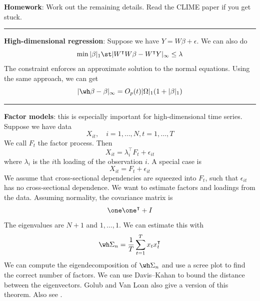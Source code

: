 \textbf{Homework}: Work out the remaining details. Read the CLIME paper \citep{CLM11} if you get stuck.

\begin{center}\rule{0.5\linewidth}{0.5pt}\end{center}

\textbf{High-dimensional regression}: Suppose we have \(Y = W \beta + \epsilon\). We can also do
\[\min |\beta|_1 \st |W^\intercal W \beta - W^\intercal Y|_\infty \leq \lambda\]
The constraint enforces an approximate solution to the normal equations. Using the same approach, we can get
\[|\wh \beta - \beta|_\infty = O_p(t) |\Omega|_1 (1 + |\beta|_1)\]

\begin{center}\rule{0.5\linewidth}{0.5pt}\end{center}

\textbf{Factor models}: this is especially important for high-dimensional time series. Suppose we have data
\[X_{it}, \quad i = 1, \dots, N, t = 1, \dots, T\]
We call \(F_t\) the factor process. Then
\[X_{it} = \lambda_i^\intercal F_t + \epsilon_{it}\]
where \(\lambda_i\) is the \(i\)th loading of the observation \(i\). A special case is
\[X_{it} = F_t + \epsilon_{it}\]
We assume that cross-sectional dependencies are squeezed into \(F_t\), such that \(\epsilon_{it}\) has no cross-sectional dependence. We want to estimate factors and loadings from the data. Assuming normality, the covariance matrix is
\[\one\one^\intercal + I\]
The eigenvalues are \(N + 1\) and \(1, \dots, 1\). We can estimate this with
\[\wh \Sigma_n = \frac{1}{T}\sum_{t=1}^T x_t x_t^\intercal\]
We can compute the eigendecomposition of \(\wh \Sigma_n\) and use a scree plot to find the correct number of factors. We can use Davis--Kahan \citep{DK70} to bound the distance between the eigenvectors. Golub and Van Loan \citep{GVL13} also give a version of this theorem. Also see \citet{YWS15}.
